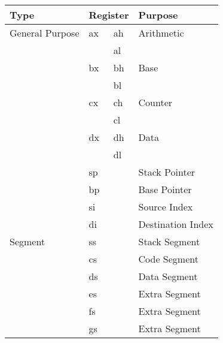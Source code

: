 \documentclass{article}
\begin{document}
  \begin{center}
    \begin{tabular}{llll}
      \toprule
      Type & \multicolumn{2}{l}{Register} & Purpose \\
      \midrule
      General Purpose & ax & ah & Arithmetic \\
      & & al & \\
      \addlinespace %
      & bx & bh & Base \\
      &  & bl & \\
      \addlinespace
      & cx & ch & Counter \\
      & & cl & \\
      \addlinespace
      & dx & dh & Data \\
      & & dl & \\
      \cmidrule{2-4}
      & \multicolumn{2}{l}{sp} & Stack Pointer \\
      & \multicolumn{2}{l}{bp} & Base Pointer \\
      & \multicolumn{2}{l}{si} & Source Index \\
      & \multicolumn{2}{l}{di} & Destination Index \\
      \midrule
      Segment & \multicolumn{2}{l}{ss} & Stack Segment \\
      & \multicolumn{2}{l}{cs} & Code Segment \\
      & \multicolumn{2}{l}{ds} & Data Segment \\
      & \multicolumn{2}{l}{es} & Extra Segment \\
      & \multicolumn{2}{l}{fs} & Extra Segment \\
      & \multicolumn{2}{l}{gs} & Extra Segment \\
      \bottomrule
    \end{tabular}
  \end{center}
\end{document}
